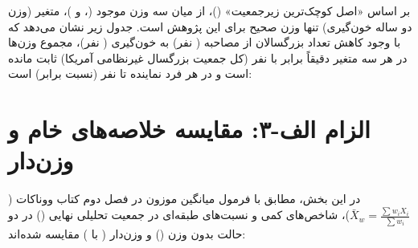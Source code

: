 \documentclass[12pt]{exam}
\begin{document}
بر اساس «اصل کوچک‌ترین زیرجمعیت» ()، از میان سه وزن موجود (،  و )، متغیر  (وزن دو ساله خون‌گیری) تنها وزن صحیح برای این پژوهش است. جدول زیر نشان می‌دهد که با وجود کاهش تعداد بزرگسالان از مصاحبه ( نفر) به خون‌گیری ( نفر)، مجموع وزن‌ها در هر سه متغیر دقیقاً برابر با  نفر (کل جمعیت بزرگسال غیرنظامی آمریکا) ثابت مانده است و در  هر فرد نماینده  تا  نفر (نسبت  برابر) است:

\begin{table}[htbp]
\centering
\caption{مشخصات و دامنه تغییرات وزن‌های نمونه‌گیری در زیرجمعیت بزرگسالان ( سال و بالاتر)}
\end{table}


\section{الزام الف-۳: مقایسه خلاصه‌های خام و وزن‌دار}

در این بخش، مطابق با فرمول میانگین موزون در فصل دوم کتاب ووناکات ($\bar{X}_w = \frac{\sum w_i X_i}{\sum w_i}$)، شاخص‌های کمی و نسبت‌های طبقه‌ای در جمعیت تحلیلی نهایی () در دو حالت بدون وزن () و وزن‌دار ( با ) مقایسه شده‌اند:
\end{document}
